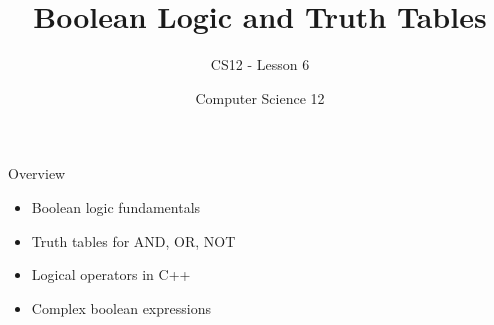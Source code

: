 \documentclass[10pt]{beamer}
\title{Boolean Logic and Truth Tables}
\subtitle{CS12 - Lesson 6}
\author{Computer Science 12}
\date{}
\begin{document}
\begin{frame}
    \titlepage
\end{frame}

\begin{frame}{Overview}
    \begin{itemize}
        \item Boolean logic fundamentals
        \item Truth tables for AND, OR, NOT
        \item Logical operators in C++
        \item Complex boolean expressions
    \end{itemize}
\end{frame}

\end{document}
